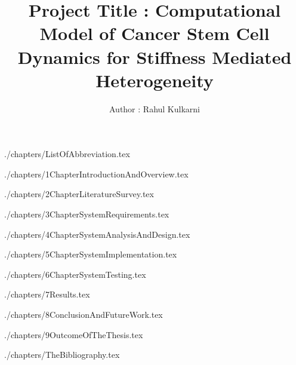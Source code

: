 \documentclass[a4paper,12pt]{report}
\date{}
\title{Project Title : Computational Model of Cancer Stem Cell Dynamics for Stiffness Mediated Heterogeneity}
\author{Author : Rahul Kulkarni}
\begin{document}
 \setcounter{page}{1}
\newpage \tableofcontents

\newpage 
{%
\let\oldnumberline\numberline%
\renewcommand{\numberline}{\figurename~\oldnumberline}%
\listoffigures%
}

\newpage \listoftables

\newpage
\thispagestyle{plain}


{./chapters/ListOfAbbreviation.tex}

{./chapters/1ChapterIntroductionAndOverview.tex}

{./chapters/2ChapterLiteratureSurvey.tex}

{./chapters/3ChapterSystemRequirements.tex}

{./chapters/4ChapterSystemAnalysisAndDesign.tex}
 
{./chapters/5ChapterSystemImplementation.tex}

{./chapters/6ChapterSystemTesting.tex}

{./chapters/7Results.tex}

{./chapters/8ConclusionAndFutureWork.tex}

{./chapters/9OutcomeOfTheThesis.tex}  

{./chapters/TheBibliography.tex}  
\end{document}
